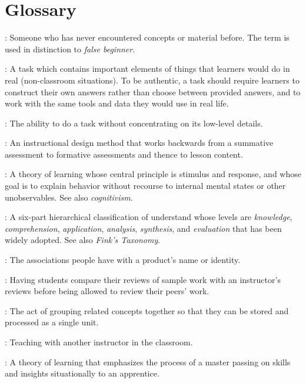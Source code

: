 \chapter{Glossary}\label{s:gloss}

\begin{description}

: Someone who has
never encountered concepts or material before. The term is used in
distinction to \emph{false beginner}.

: A task which contains
important elements of things that learners would do in real
(non-classroom situations). To be authentic, a task should require
learners to construct their own answers rather than choose between
provided answers, and to work with the same tools and data they would
use in real life.

: The ability to do a task
without concentrating on its low-level details.

: An instructional design
method that works backwards from a summative assessment to formative
assessments and thence to lesson content.

: A theory of learning whose
central principle is stimulus and response, and whose goal is to explain
behavior without recourse to internal mental states or other
unobservables. See also \emph{cognitivism}.

: A six-part
hierarchical classification of understand whose levels are \emph{knowledge},
\emph{comprehension}, \emph{application}, \emph{analysis}, \emph{synthesis}, and
\emph{evaluation} that has been widely adopted. See also \emph{Fink's Taxonomy}.

: The associations people have with a
product's name or identity.

: Having
students compare their reviews of sample work with an instructor's
reviews before being allowed to review their peers' work.

: The act of grouping related concepts
together so that they can be stored and processed as a single unit.

: Teaching with another
instructor in the classroom.

: A
theory of learning that emphasizes the process of a master passing on
skills and insights situationally to an apprentice.


\end{description}
